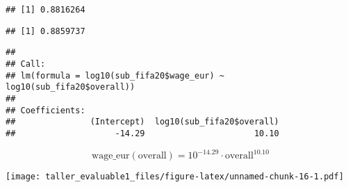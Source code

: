 \documentclass[
]{article}
\newenvironment{Shaded}{\begin{snugshade}}{\end{snugshade}}
\newcommand{\DataTypeTok}[1]{\textcolor[rgb]{0.13,0.29,0.53}{#1}}
\newcommand{\DecValTok}[1]{\textcolor[rgb]{0.00,0.00,0.81}{#1}}
\newcommand{\FloatTok}[1]{\textcolor[rgb]{0.00,0.00,0.81}{#1}}
\newcommand{\KeywordTok}[1]{\textcolor[rgb]{0.13,0.29,0.53}{\textbf{#1}}}
\newcommand{\NormalTok}[1]{#1}
\newcommand{\OperatorTok}[1]{\textcolor[rgb]{0.81,0.36,0.00}{\textbf{#1}}}
\newcommand{\OtherTok}[1]{\textcolor[rgb]{0.56,0.35,0.01}{#1}}
\newcommand{\StringTok}[1]{\textcolor[rgb]{0.31,0.60,0.02}{#1}}
\begin{document}
\begin{verbatim}
## [1] 0.8816264
\end{verbatim}

\begin{Shaded}
\end{Shaded}

\begin{verbatim}
## [1] 0.8859737
\end{verbatim}

\begin{Shaded}
\end{Shaded}

\begin{verbatim}
## 
## Call:
## lm(formula = log10(sub_fifa20$wage_eur) ~ log10(sub_fifa20$overall))
## 
## Coefficients:
##               (Intercept)  log10(sub_fifa20$overall)  
##                    -14.29                      10.10
\end{verbatim}

\[
\textrm{wage_eur}(\textrm{overall}) = 10^{-14.29} \cdot \textrm{overall}^{10.10}
\]

\begin{Shaded}
\end{Shaded}

\texttt{[image: taller\_evaluable1\_files/figure-latex/unnamed-chunk-16-1.pdf]}
\end{document}

